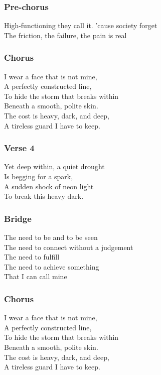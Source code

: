 \documentclass[]{article}
\begin{document}
\subsubsection{Pre-chorus}\label{pre-chorus-8}

High-functioning they call it. 'cause society forget\\
The friction, the failure, the pain is real

\subsubsection{Chorus}\label{chorus-15}

I wear a face that is not mine,\\
A perfectly constructed line,\\
To hide the storm that breaks within\\
Beneath a smooth, polite skin.\\
The cost is heavy, dark, and deep,\\
A tireless guard I have to keep.

\subsubsection{Verse 4}\label{verse-4-4}

Yet deep within, a quiet drought\\
Is begging for a spark,\\
A sudden shock of neon light\\
To break this heavy dark.

\subsubsection{Bridge}\label{bridge-3}

The need to be and to be seen\\
The need to connect without a judgement\\
The need to fulfill\\
The need to achieve something\\
That I can call mine

\subsubsection{Chorus}\label{chorus-16}

I wear a face that is not mine,\\
A perfectly constructed line,\\
To hide the storm that breaks within\\
Beneath a smooth, polite skin.\\
The cost is heavy, dark, and deep,\\
A tireless guard I have to keep.
\end{document}
